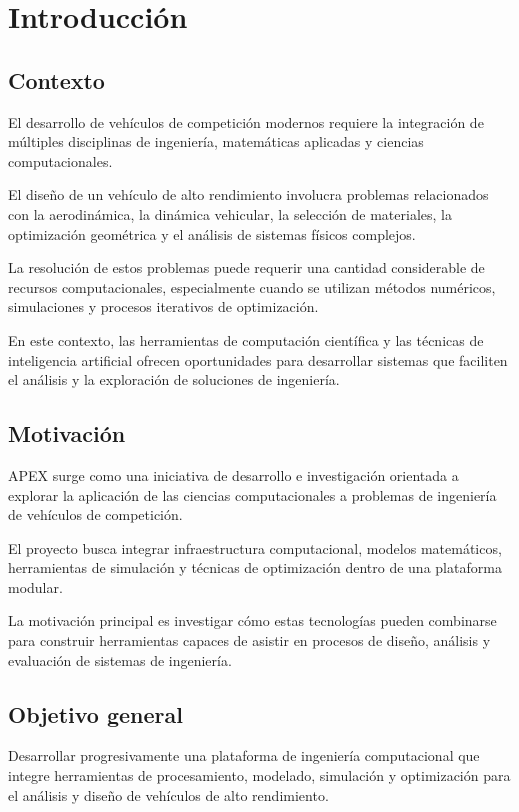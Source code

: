 
\chapter{Introducción}

\section{Contexto}

El desarrollo de vehículos de competición modernos requiere
la integración de múltiples disciplinas de ingeniería,
matemáticas aplicadas y ciencias computacionales.

El diseño de un vehículo de alto rendimiento involucra
problemas relacionados con la aerodinámica, la dinámica
vehicular, la selección de materiales, la optimización
geométrica y el análisis de sistemas físicos complejos.

La resolución de estos problemas puede requerir una cantidad
considerable de recursos computacionales, especialmente
cuando se utilizan métodos numéricos, simulaciones y procesos
iterativos de optimización.

En este contexto, las herramientas de computación científica
y las técnicas de inteligencia artificial ofrecen
oportunidades para desarrollar sistemas que faciliten
el análisis y la exploración de soluciones de ingeniería.

\section{Motivación}

APEX surge como una iniciativa de desarrollo e investigación
orientada a explorar la aplicación de las ciencias
computacionales a problemas de ingeniería de vehículos
de competición.

El proyecto busca integrar infraestructura computacional,
modelos matemáticos, herramientas de simulación y técnicas
de optimización dentro de una plataforma modular.

La motivación principal es investigar cómo estas tecnologías
pueden combinarse para construir herramientas capaces de
asistir en procesos de diseño, análisis y evaluación
de sistemas de ingeniería.

\section{Objetivo general}

Desarrollar progresivamente una plataforma de ingeniería
computacional que integre herramientas de procesamiento,
modelado, simulación y optimización para el análisis
y diseño de vehículos de alto rendimiento.

